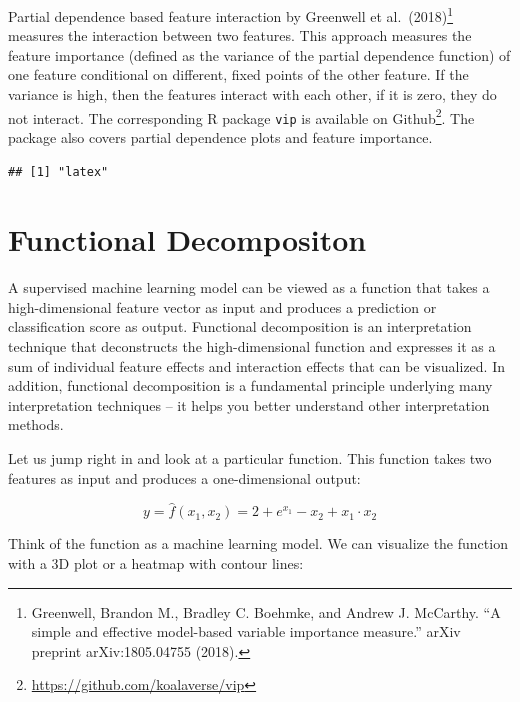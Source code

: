\documentclass[
  11pt,
]{scrbook}
\renewcommand{\href}[2]{#2\footnote{\url{#1}}}
\begin{document}
Partial dependence based feature interaction by Greenwell et al.~(2018)\footnote{Greenwell, Brandon M., Bradley C. Boehmke, and Andrew J. McCarthy. ``A simple and effective model-based variable importance measure.'' arXiv preprint arXiv:1805.04755 (2018).} measures the interaction between two features.
This approach measures the feature importance (defined as the variance of the partial dependence function) of one feature conditional on different, fixed points of the other feature.
If the variance is high, then the features interact with each other, if it is zero, they do not interact.
The corresponding R package \texttt{vip} is available on \href{https://github.com/koalaverse/vip}{Github}.
The package also covers partial dependence plots and feature importance.

\begin{verbatim}
## [1] "latex"
\end{verbatim}

\hypertarget{decomposition}{%
\section{Functional Decompositon}\label{decomposition}}

A supervised machine learning model can be viewed as a function that takes a high-dimensional feature vector as input and produces a prediction or classification score as output.
Functional decomposition is an interpretation technique that deconstructs the high-dimensional function and expresses it as a sum of individual feature effects and interaction effects that can be visualized.
In addition, functional decomposition is a fundamental principle underlying many interpretation techniques -- it helps you better understand other interpretation methods.

Let us jump right in and look at a particular function.
This function takes two features as input and produces a one-dimensional output:

\[y = \hat{f}(x_1, x_2) = 2 + e^{x_1} - x_2 + x_1 \cdot x_2\]

Think of the function as a machine learning model.
We can visualize the function with a 3D plot or a heatmap with contour lines:
\end{document}
